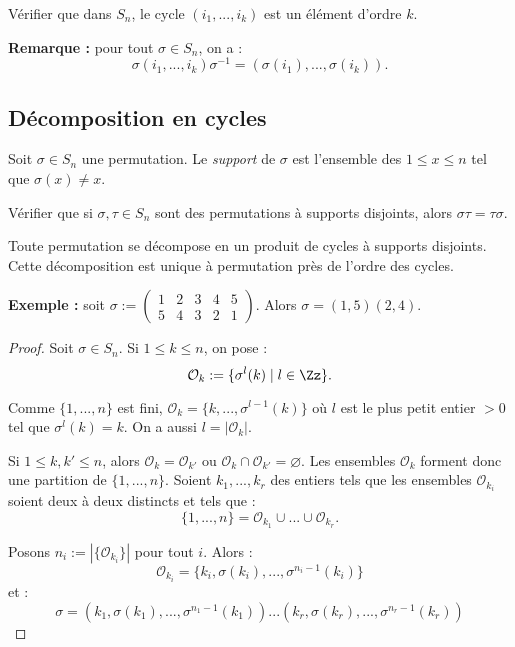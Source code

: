 \documentclass[class=report,crop=false]{standalone}
\begin{document}
\begin{exercicecours}
Vérifier que dans $S_n$, le cycle $(i_1,...,i_k)$ est un élément d'ordre $k$.
\end{exercicecours}

{\bf Remarque :} pour tout $\sigma \in S_n$, on a :
\[\sigma (i_1,...,i_k) \sigma^{-1} = (\sigma(i_1),...,\sigma(i_k)).\]

\subsection{Décomposition en cycles }

Soit $\sigma \in S_n$ une permutation. Le {\it support}  de $\sigma$ est l'ensemble des $1 \le x \le n$ tel que $\sigma(x) \neq x$.

\begin{exercicecours}
Vérifier que si $\sigma,\tau \in S_n$ sont des permutations à supports disjoints, alors $\sigma \tau = \tau \sigma$.
\end{exercicecours}

\begin{proposition}
Toute permutation se décompose en un produit de cycles à supports disjoints. Cette décomposition est unique à permutation près de l'ordre des cycles.
\end{proposition}


{\bf Exemple :} soit $\sigma := \left(\begin{array}{ccccc}
1&2&3&4&5\\
5&4&3&2&1
\end{array}\right)$. Alors $\sigma = (1,5)(2,4)$.


\begin{proof}
Soit $\sigma \in S_n$. Si $1 \le k \le n$, on pose :
\[\mathcal{O}_k:=\{\sigma^l (k) \mid l \in \Zz\}.\]

Comme $\{1,...,n\}$ est fini, $\mathcal{O}_k= \{k,...,\sigma^{l-1}(k)\}$ où $l$ est le plus petit entier $>0$ tel que $\sigma^l(k)=k$. On a aussi $l = |\mathcal{O}_k|$.

Si $1 \le k,k' \le n$, alors $\mathcal{O}_{k}=\mathcal{O}_{k'}$ ou $\mathcal{O}_k \cap \mathcal{O}_{k'}= \varnothing$. Les ensembles $\mathcal{O}_k$ forment donc une partition de $\{1,...,n\}$. Soient $k_1,...,k_r$ des entiers tels que les ensembles $\mathcal{O}_{k_i}$ soient deux à deux distincts et tels que :
\[\{1,...,n\} = \mathcal{O}_{k_1} \cup ... \cup \mathcal{O}_{k_r} .\]

Posons $n_i := |\{\mathcal{O}_{k_i}\}|$ pour tout $i$. Alors :
\[\mathcal{O}_{k_i} = \{ k_i,\sigma(k_i),...,\sigma^{n_i-1}(k_i)\} \]
et :
\[\sigma = (k_1,\sigma(k_1),...,\sigma^{n_1-1}(k_1))...(k_r,\sigma(k_r),...,\sigma^{n_r-1}(k_r))\]
\end{proof}
\end{document}
